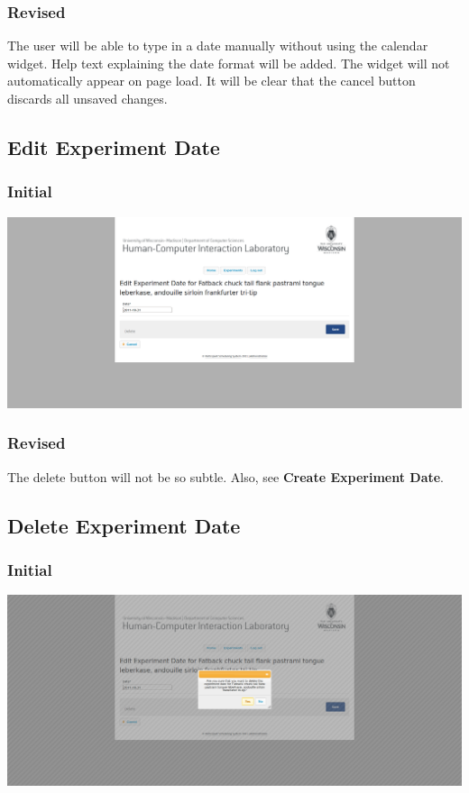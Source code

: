 \subsubsection{Revised}
The user will be able to type in a date manually without using the calendar widget. Help text explaining the date format will be added. The widget will not automatically appear on page load. It will be clear that the cancel button discards all unsaved changes.

\subsection{Edit Experiment Date}
\subsubsection{Initial}
\includegraphics[width=6in]{../other/initial-interface-design/edit-experiment-date.png}
\subsubsection{Revised}
The delete button will not be so subtle. Also, see \textbf{Create Experiment Date}.

\subsection{Delete Experiment Date}
\subsubsection{Initial}
\includegraphics[width=6in]{../other/initial-interface-design/delete-experiment-date.png}
